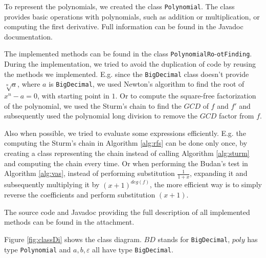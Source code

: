 \documentclass[
  digital, %
  notable,   %
  nolof,     %
  nolot,     %
	final, %
]{fithesis3}
\begin{document}
To represent the polynomials, we created the class \texttt{Polynomial}. The class provides basic operations with polynomials, such as addition or multiplication, or computing the first derivative. Full information can be found in the Javadoc documentation.

The implemented methods can be found in the class \texttt{PolynomialRo}-\texttt{otFinding}. During the implementation, we tried to avoid the duplication of code by reusing the methods we implemented. E.g. since the \texttt{BigDecimal} class doesn't provide $\sqrt[n]{a}$, where $a$ is \texttt{BigDecimal}, we used Newton's algorithm to find the root of $x^{n}-a=0$, with starting point in $1$. Or to compute the square-free factorization of the polynomial, we used the Sturm's chain to find the $GCD$ of $f$ and $f'$ and subsequently used the polynomial long division to remove the $GCD$ factor from $f$.

Also when possible, we tried to evaluate some expressions efficiently. E.g. the computing the Sturm's chain in Algorithm \ref{alg:rfs} can be done only once, by creating a class representing the chain instead of calling Algorithm \ref{alg:sturm} and computing the chain every time. Or when performing the Budan's test in Algorithm \ref{alg:vas}, instead of performing substitution $\frac{1}{1+x}$, expanding it and subsequently multiplying it by $(x+1)^{deg(f)}$, the more efficient way is to simply reverse the coefficients and perform substitution $(x+1)$.

The source code and Javadoc providing the full description of all implemented methods can be found in the attachment.

Figure \ref{fig:classDi} shows the class diagram. $BD$ stands for \texttt{BigDecimal}, $poly$ has type \texttt{Polynomial} and $a, b, \varepsilon$ all have type \texttt{BigDecimal}.
\end{document}

